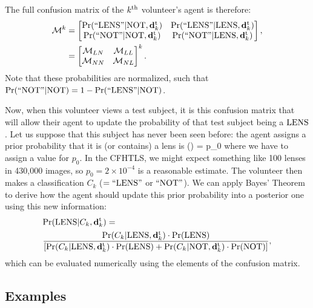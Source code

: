 \documentclass[useAMS,usenatbib,a4paper]{mn2e}
\begin{document}
The full confusion matrix of the $k^{\rm th}$ volunteer's agent is therefore:
\begin{align}
  \mathcal{M}^k &= 
  \begin{bmatrix}
    {\rm Pr}({\rm ``LENS"}|{\rm NOT},{\mathbf{d}^{\rm t}_k}) & {\rm Pr}({\rm ``LENS"}|{\rm LENS},{\mathbf{d}^{\rm t}_k}) \\
    {\rm Pr}({\rm ``NOT"} |{\rm NOT},{\mathbf{d}^{\rm t}_k}) & {\rm Pr}({\rm ``NOT"} |{\rm LENS},{\mathbf{d}^{\rm t}_k})
  \end{bmatrix}, \notag \\
        &=
  \begin{bmatrix}
    \mathcal{M}_{LN} & \mathcal{M}_{LL} \\
    \mathcal{M}_{NN} & \mathcal{M}_{NL}
  \end{bmatrix}^k.
  \label{eq:confmat}
\end{align}
Note that these probabilities are normalized, such that
${\rm Pr}({\rm ``NOT"} |{\rm NOT}) = 1 - {\rm Pr}({\rm ``LENS"}|{\rm NOT})$.

Now, when this volunteer views a test subject, 
it is this confusion matrix that will allow their agent to update the
probability of that test subject being a ${\rm LENS}$. Let us suppose that
this subject has never been seen before: the agent assigns a 
prior probability that it is (or contains) a lens is 
\be
  \pr(\LENS) = p_0
\ee
where we have to assign a value for $p_0$. In the CFHTLS, we might expect
something like 100 lenses in 430,000 images, so $p_0 = 2\times10^{-4}$
is a reasonable estimate. The volunteer then makes a classification $C_k$ 
($= {\rm ``LENS"}$ or ${\rm ``NOT"}$).
We can apply Bayes' Theorem to derive how the agent should
update this prior probability into a posterior one using this new information:
\begin{align}
  \label{eq:app:first}
  & {\rm Pr}({\rm LENS}|C_k,{\mathbf{d}^{\rm t}_k}) = \\
  & \frac{{\rm Pr}(C_k|{\rm LENS},{\mathbf{d}^{\rm t}_k})\cdot{\rm Pr}({\rm LENS})}
{\left[ {\rm Pr}(C_k|{\rm LENS},{\mathbf{d}^{\rm t}_k})\cdot{\rm Pr}({\rm LENS}) + {\rm Pr}(C_k|{\rm NOT},{\mathbf{d}^{\rm t}_k})\cdot{\rm Pr}({\rm NOT}) \right]},
  \notag
\end{align}
which can be evaluated numerically using the elements of the confusion
matrix. 

\subsection{Examples}
\label{appendix:swap:examples}
\end{document}
